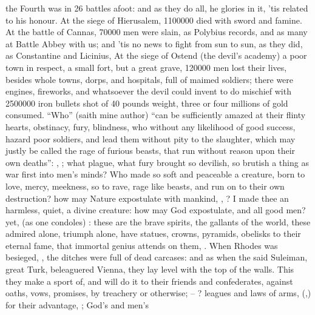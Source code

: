 the Fourth was in 26 battles afoot: and as they do all, he glories in it, 'tis
related to his honour. At the siege of Hierusalem,
1\thinspace{}100\thinspace{}000 died with sword and famine. At the battle of
Cannas, 70\thinspace{}000 men were slain, as Polybius
records, and as many at Battle Abbey with us; and 'tis no news to fight from
sun to sun, as they did, as Constantine and Licinius, \etc{} At the siege of
Ostend (the devil's academy) a poor town in respect, a small fort, but a great
grave, 120\thinspace{}000 men lost their lives, besides whole towns, dorps, and
hospitals, full of maimed soldiers; there were engines, fireworks, and
whatsoever the devil could invent to do mischief with
2\thinspace{}500\thinspace{}000 iron bullets shot of 40 pounds weight, three or
four millions of gold consumed. \enquote{Who} (saith mine author)
\enquote{can be sufficiently amazed at their flinty hearts, obstinacy, fury, blindness,
who without any likelihood of good success, hazard poor soldiers, and lead them
without pity to the slaughter, which may justly be called the rage of furious
beasts, that run without reason upon their own deaths}:
, \etc{};
what plague, what fury brought so devilish, so brutish a thing as war first
into men's minds? Who made so soft and peaceable a creature, born to love,
mercy, meekness, so to rave, rage like beasts, and run on to their own
destruction? how may Nature expostulate with mankind, , \etc{}? I made thee an harmless, quiet, a divine creature: how may God
expostulate, and all good men? yet,  (as
one condoles) : these are the brave spirits, the gallants of the world, these admired
alone, triumph alone, have statues, crowns, pyramids, obelisks to their eternal
fame, that immortal genius attends on them, . When Rhodes
was besieged, ,
the ditches were full of dead carcases: and as when the said Suleiman, great
Turk, beleaguered Vienna, they lay level with the top of the walls. This they
make a sport of, and will do it to their friends and confederates, against
oaths, vows, promises, by treachery or otherwise; --
? leagues and laws of arms,
(,) for their advantage,
; God's and men's
